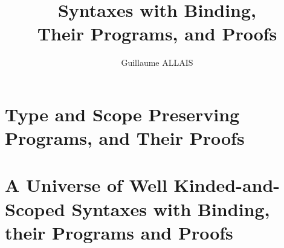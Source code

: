 \documentclass{memoir}
\title{\Huge Syntaxes with Binding, \\ Their Programs, and Proofs}
\author{\Large Guillaume ALLAIS}
\begin{document}
\frontmatter

\cleardoublepage{}

\maketitle{}

\mainmatter
\pagestyle{ruled}
\begin{KeepFromToc}
\tableofcontents
\end{KeepFromToc}

\label{introduction}


\label{introduction-agda}


\part{Type and Scope Preserving Programs, and Their Proofs}
\label{type-scope-semantics}





\label{properties}





\part{A Universe of Well Kinded-and-Scoped Syntaxes with Binding, their Programs and Proofs}
\label{a-universe}









\cleardoublepage{}
\listoffigures


\end{document}
